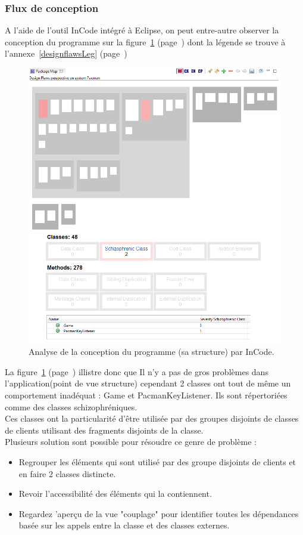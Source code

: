 \documentclass[12pt,a4paper,final]{article}
\newcommand{\annexe}[1]{annexe~\ref{#1} (page~\pageref{#1})}
\newcommand{\labelfigure}[1]{figure~\ref{#1} (page~\pageref{#1})}
\begin{document}
\subsubsection{Flux de conception}\label{sec:designflaws}
A l'aide de l'outil InCode intégré à Eclipse, on peut entre-autre observer la conception du programme sur la \labelfigure{designflaws} dont la légende se trouve à l'\annexe{designflawsLeg}
\begin{figure}[!h]
	\centering
	\includegraphics[width=\textwidth]{InCodeDesignFlaws.png}
	\caption{\label{designflaws}Analyse de la conception du programme (sa structure) par InCode.}
\end{figure}
La \labelfigure{designflaws} illistre donc que Il n'y a pas de gros problèmes dans l'application(point de vue structure) cependant 2 classes ont tout de même un comportement inadéquat : Game et PacmanKeyListener. Ils sont répertoriées comme des classes schizophréniques.\\
Ces classes ont la particularité  d'être utilisée par des groupes disjoints de classes de clients utilisant des fragments disjoints de la classe.\\
Plusieurs solution sont possible pour résoudre ce genre de problème :
\begin{itemize}
\item Regrouper les éléments qui sont utilisé par des groupe disjoints de clients et en faire 2 classes distincte.
\item Revoir l'accessibilité des éléments qui la contiennent.
\item Regardez 'aperçu de la vue "couplage" pour identifier toutes les dépendances basée sur les appels entre la classe et des classes externes.
\end{itemize}
\end{document}
